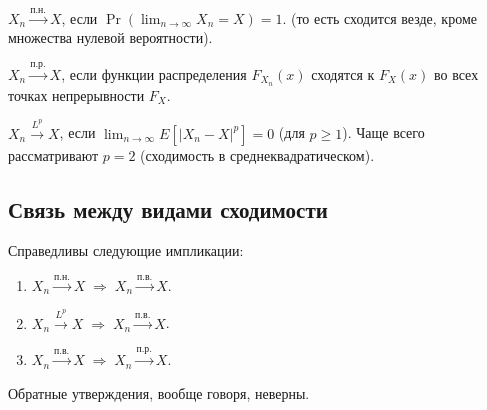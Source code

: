\documentclass[10pt]{article}
\begin{document}
\begin{definition}
$X_n \xrightarrow{\text{п.н.}} X$, если $\Pr(\lim_{n\to\infty} X_n = X) = 1$. (то есть сходится везде, кроме множества нулевой вероятности).
\end{definition}

\begin{definition}
$X_n \xrightarrow{\text{п.р.}} X$, если функции распределения $F_{X_n}(x)$ сходятся к $F_X(x)$ во всех точках непрерывности $F_X$.
\end{definition}

\begin{definition}
$X_n \xrightarrow{L^p} X$, если $\lim_{n\to\infty} E[|X_n - X|^p] = 0$ (для $p \ge 1$). Чаще всего рассматривают $p=2$ (сходимость в среднеквадратическом).
\end{definition}

\subsection*{Связь между видами сходимости}
\begin{theorem}
Справедливы следующие импликации:
\begin{enumerate}
    \item $X_n \xrightarrow{\text{п.н.}} X \;\Rightarrow\; X_n \xrightarrow{\text{п.в.}} X$.
    \item $X_n \xrightarrow{L^p} X \;\Rightarrow\; X_n \xrightarrow{\text{п.в.}} X$.
    \item $X_n \xrightarrow{\text{п.в.}} X \;\Rightarrow\; X_n \xrightarrow{\text{п.р.}} X$.
\end{enumerate}
Обратные утверждения, вообще говоря, неверны.
\end{theorem}
\end{document}
